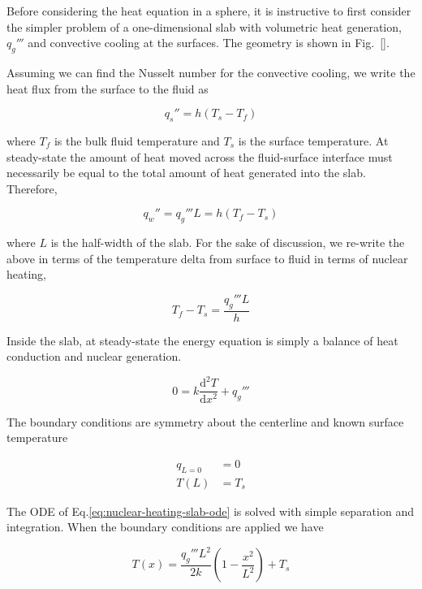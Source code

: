 
Before considering the heat equation in a sphere, it is instructive to first consider the simpler problem of a one-dimensional slab with volumetric heat generation, $q_g'''$ and convective cooling at the surfaces. The geometry is shown in Fig.~\ref{}.

Assuming we can find the Nusselt number for the convective cooling, we write the heat flux from the surface to the fluid as

\begin{equation}
	q_s'' = h(T_s - T_f)	
\end{equation}

where $T_f$ is the bulk fluid temperature and $T_s$ is the surface temperature. At steady-state the amount of heat moved across the fluid-surface interface must necessarily be equal to the total amount of heat generated into the slab. Therefore,

\begin{equation}
	q_w'' = q_g'''L = h(T_f-T_s)
\end{equation}

where $L$ is the half-width of the slab. For the sake of discussion, we re-write the above in terms of the temperature delta from surface to fluid in terms of nuclear heating,

\begin{equation}\label{eq:fluid-delta}
	T_f-T_s = \frac{q_g'''L}{h}
\end{equation}

Inside the slab, at steady-state the energy equation is simply a balance of heat conduction and nuclear generation. 

\begin{equation}\label{eq:nuclear-heating-slab-ode}
	0 = k\frac{\mathrm{d}^2T}{\mathrm{d}x^2} + q_g'''
\end{equation}

The boundary conditions are symmetry about the centerline and known surface temperature

\begin{align}
	q_{L=0} &= 0 \\
	T(L) &= T_s
\end{align}

The ODE of Eq.\ref{eq:nuclear-heating-slab-ode} is solved with simple separation and integration. When the boundary conditions are applied we have

\begin{equation}
	T(x) = \frac{q_g''' L^2}{2k}\left(1-\frac{x^2}{L^2}\right) + T_s
\end{equation}

